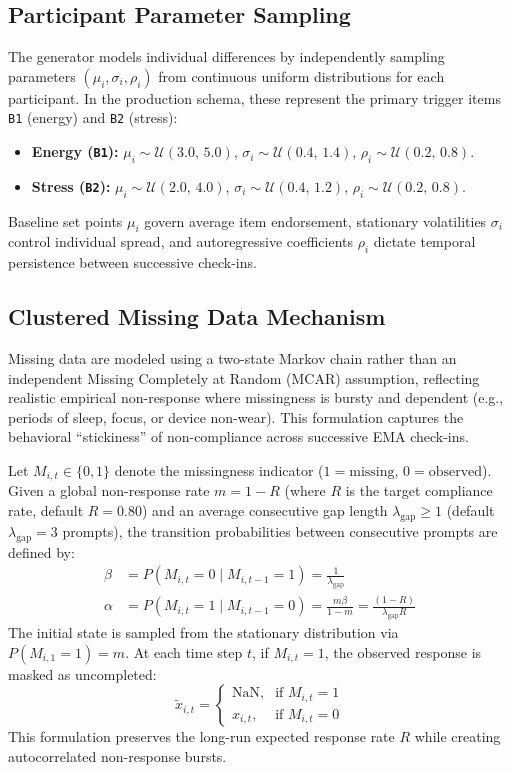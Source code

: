 \documentclass[11pt,letterpaper]{article}
\begin{document}
\subsection{Participant Parameter Sampling}

The generator models individual differences by independently sampling parameters $(\mu_i, \sigma_i, \rho_i)$ from continuous uniform distributions for each participant. In the production schema, these represent the primary trigger items \texttt{B1} (energy) and \texttt{B2} (stress):
\begin{itemize}
    \item \textbf{Energy (\texttt{B1}):} $\mu_i \sim \mathcal{U}(3.0,\, 5.0)$, $\sigma_i \sim \mathcal{U}(0.4,\, 1.4)$, $\rho_i \sim \mathcal{U}(0.2,\, 0.8)$.
    \item \textbf{Stress (\texttt{B2}):} $\mu_i \sim \mathcal{U}(2.0,\, 4.0)$, $\sigma_i \sim \mathcal{U}(0.4,\, 1.2)$, $\rho_i \sim \mathcal{U}(0.2,\, 0.8)$.
\end{itemize}
Baseline set points $\mu_i$ govern average item endorsement, stationary volatilities $\sigma_i$ control individual spread, and autoregressive coefficients $\rho_i$ dictate temporal persistence between successive check-ins.

\subsection{Clustered Missing Data Mechanism}

Missing data are modeled using a two-state Markov chain rather than an independent Missing Completely at Random (MCAR) assumption, reflecting realistic empirical non-response where missingness is bursty and dependent (e.g., periods of sleep, focus, or device non-wear). This formulation captures the behavioral ``stickiness'' of non-compliance across successive EMA check-ins.

Let $M_{i,t} \in \{0, 1\}$ denote the missingness indicator ($1 = \text{missing}$, $0 = \text{observed}$). Given a global non-response rate $m = 1 - R$ (where $R$ is the target compliance rate, default $R = 0.80$) and an average consecutive gap length $\lambda_{\text{gap}} \ge 1$ (default $\lambda_{\text{gap}} = 3$ prompts), the transition probabilities between consecutive prompts are defined by:
\begin{align}
\beta &= P(M_{i,t} = 0 \mid M_{i,t-1} = 1) = \frac{1}{\lambda_{\text{gap}}} \\
\alpha &= P(M_{i,t} = 1 \mid M_{i,t-1} = 0) = \frac{m \beta}{1 - m} = \frac{(1 - R)}{\lambda_{\text{gap}} R}
\end{align}
The initial state is sampled from the stationary distribution via $P(M_{i,1} = 1) = m$. At each time step $t$, if $M_{i,t} = 1$, the observed response is masked as uncompleted:
\begin{equation}
\tilde{x}_{i,t} = \begin{cases} 
\text{NaN}, & \text{if } M_{i,t} = 1 \\ 
x_{i,t}, & \text{if } M_{i,t} = 0 
\end{cases}
\end{equation}
This formulation preserves the long-run expected response rate $R$ while creating autocorrelated non-response bursts.
\end{document}
